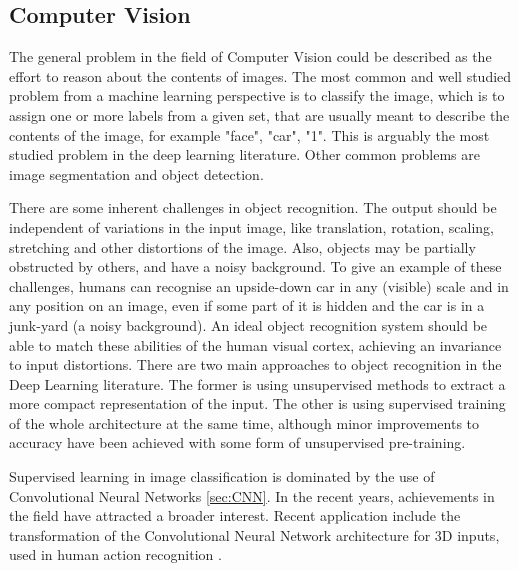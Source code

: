 \documentclass[a4paper]{article}
\begin{document}
	\subsection{Computer Vision}
	\label{sec:CV}
		The general problem in the field of Computer Vision could be described as the effort to reason about the contents of images. 
		The most common and well studied problem from a machine learning perspective is to classify the image, which is to assign one or more labels from a given set, that are usually meant to describe the contents of the image, for example "face", "car", "1". This is arguably the most studied problem in the deep learning literature.
		Other common problems are image segmentation and object detection.
		
		There are some inherent challenges in object recognition. The output should be independent of variations in the input image, like translation, rotation, scaling, stretching and other distortions of the image. Also, objects may be partially obstructed by others, and have a noisy background. To give an example of these challenges, humans can recognise an upside-down car in any (visible) scale and in any position on an image, even if some part of it is hidden and the car is in a junk-yard (a noisy background). An ideal object recognition system should be able to match these abilities of the human visual cortex, achieving an invariance to input distortions. 		
		There are two main approaches to object recognition in the Deep Learning literature. The former is using unsupervised methods to extract a more compact representation of the input. The other is using supervised training of the whole architecture at the same time, although minor improvements to accuracy have been achieved with some form of unsupervised pre-training.
	
		Supervised learning in image classification is dominated by the use of Convolutional Neural Networks \ref{sec:CNN}. In the recent years, achievements \cite{Krizhevsky2012} in the field have attracted a broader interest.
		Recent application include the transformation of the Convolutional Neural Network architecture for 3D inputs, used in human action recognition \cite{Ji2013}.
	
\end{document}
